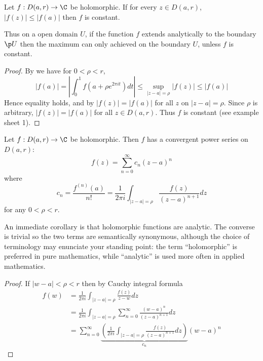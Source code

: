 \documentclass[a4paper]{article}
\begin{document}
\begin{theorem}
  \label{thm:local maximum principle}
  Let \(f: D(a, r) \to \C\) be holomorphic. If for every \(z \in D(a, r)\), \(|f(z)| \leq |f(a)|\) then \(f\) is constant.
\end{theorem}

Thus on a open domain \(U\), if the function \(f\) extends analytically to the boundary \(\p U\) then the maximum can only achieved on the boundary \(U\), unless \(f\) is constant.

\begin{proof}
  By  we have for \(0 < \rho < r\),
  \[
    |f(a)|
    = \left| \int_0^1 f(a + \rho e^{2\pi it}) dt \right|
    \leq \sup_{|z - a| = \rho} |f(z)|
    \leq |f(a)|
  \]
  Hence equality holds, and by  \(|f(z)| = |f(a)|\) for all \(z\) on \(|z - a| = \rho\). Since \(\rho\) is arbitrary, \(|f(z)| = |f(a)|\) for all \(z \in D(a, r)\). Thus \(f\) is constant (see example sheet 1).
\end{proof}

\begin{theorem}
  \label{thm:Taylor}
  Let \(f: D(a, r) \to \C\) be holomorphic. Then \(f\) has a convergent power series on \(D(a, r)\):
  \[
    f(z) = \sum_{n = 0}^\infty c_n (z - a)^n
  \]
  where
  \[
    c_n = \frac{f^{(n)}(a)}{n!} = \frac{1}{2\pi i} \int_{|z - a| = \rho} \frac{f(z)}{(z - a)^{n + 1}} dz
  \]
  for any \(0 < \rho < r\).
\end{theorem}

An immediate corollary is that holomorphic functions are analytic. The converse is trivial so the two terms are semantically synonymous, although the choice of terminology may enunciate your standing point: the term ``holomorphic'' is preferred in pure mathematics, while ``analytic'' is used more often in applied mathematics.

\begin{proof}
  If \(|w - a| < \rho < r\) then by Cauchy integral formula
  \begin{align*}
    f(w) &= \frac{1}{2\pi i} \int_{|z - a| = \rho} \frac{f(z)}{z - w} dz \\
         &= \frac{1}{2\pi i} \int_{|z - a| = \rho} \sum_{n = 0}^\infty \frac{(w - a)^n}{(z - a)^{n + 1}} dz \\
         &= \sum_{n = 0}^\infty \underbrace{\left( \frac{1}{2\pi i} \int_{|z - a| = \rho} \frac{f(z)}{(z - a)^{n + 1}} dz \right)}_{c_n} (w - a)^n
  \end{align*}
\end{proof}
\end{document}
